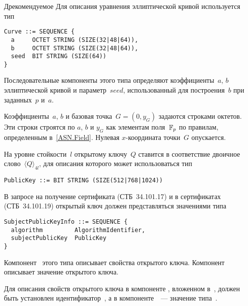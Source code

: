 \begin{appendix}{Д}{рекомендуемое}
Для описания уравнения эллиптической кривой используется тип
\begin{verbatim}
Curve ::= SEQUENCE {
  a     OCTET STRING (SIZE(32|48|64)),
  b     OCTET STRING (SIZE(32|48|64)),
  seed  BIT STRING (SIZE(64))
}
\end{verbatim}

Последовательные компоненты этого типа определяют 
коэффициенты~$a$, $b$ эллиптической кривой и параметр~$seed$,
использованный для построения~$b$ при заданных~$p$ и~$a$.

Коэффициенты~$a$, $b$ и базовая точка~$G=(0,y_G)$ 
задаются строками октетов.
%
Эти строки строятся по $a$, $b$ и $y_G$ как элементам поля~$\mathbb{F}_p$
по правилам, определенным в~\ref{ASN.Field}. 
Нулевая $x$-координата точки~$G$ опускается.

\label{ASN.PubKey}

На уровне стойкости~$l$ открытому ключу~$Q$ 
ставится в соответствие двоичное слово~$\langle Q\rangle_{4l}$,
для описания которого может использоваться тип
\begin{verbatim}
PublicKey ::= BIT STRING (SIZE(512|768|1024))
\end{verbatim}

В запросе на получение сертификата (СТБ~34.101.17) 
и в сертификатах (СТБ~34.101.19)
открытый ключ должен представляться значениями типа
\begin{verbatim}
SubjectPublicKeyInfo ::= SEQUENCE {
  algorithm         AlgorithmIdentifier,
  subjectPublicKey  PublicKey
}
\end{verbatim}

Компонент~ этого типа 
описывает свойства открытого ключа.
Компонент~ 
описывает значение открытого ключа.

Для описания свойств открытого ключа в компоненте
, вложенном в~,
должен быть установлен идентификатор~,
а в компоненте~~--- значение 
типа~.

%
%
%


\end{appendix}

